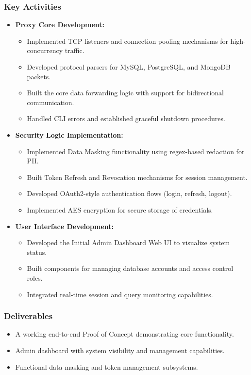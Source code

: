 \subsubsection{Key Activities}
\begin{itemize}
    \item \textbf{Proxy Core Development:}
    \begin{itemize}
        \item Implemented TCP listeners and connection pooling mechanisms for high-concurrency traffic.
        \item Developed protocol parsers for MySQL, PostgreSQL, and MongoDB packets.
        \item Built the core data forwarding logic with support for bidirectional communication.
        \item Handled CLI errors and established graceful shutdown procedures.
    \end{itemize}
    \item \textbf{Security Logic Implementation:}
    \begin{itemize}
        \item Implemented Data Masking functionality using regex-based redaction for PII.
        \item Built Token Refresh and Revocation mechanisms for session management.
        \item Developed OAuth2-style authentication flows (login, refresh, logout).
        \item Implemented AES encryption for secure storage of credentials.
    \end{itemize}
    \item \textbf{User Interface Development:}
    \begin{itemize}
        \item Developed the Initial Admin Dashboard Web UI to visualize system status.
        \item Built components for managing database accounts and access control roles.
        \item Integrated real-time session and query monitoring capabilities.
    \end{itemize}
\end{itemize}

\subsubsection{Deliverables}
\begin{itemize}
    \item A working end-to-end Proof of Concept demonstrating core functionality.
    \item Admin dashboard with system visibility and management capabilities.
    \item Functional data masking and token management subsystems.
\end{itemize}


